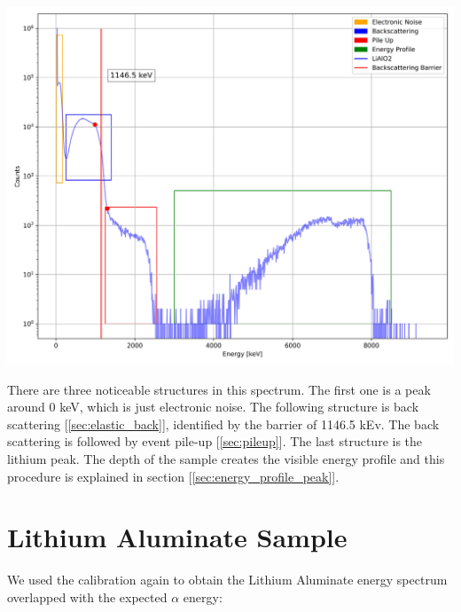 \documentclass{article}
\begin{document}
\begin{multicols}{2}
\begin{center}
    \label{TT_21}
    \centering
    \includegraphics[scale = 0.3]{../../images/FullAnalysisLiF.jpeg}
\end{center}

There are three noticeable structures in this spectrum.
The first one is a peak around 0 keV, which is just electronic noise. The following structure is back scattering [\ref{sec:elastic_back}], identified by the barrier of 1146.5 kEv.
The back scattering is followed by event pile-up [\ref{sec:pileup}].
The last structure is the lithium peak. The depth of the sample creates the visible energy profile and this procedure is explained in section [\ref{sec:energy_profile_peak}].

\section{Lithium Aluminate Sample}
    \label{sec:lialo2}

We used the calibration again to obtain the Lithium Aluminate energy spectrum overlapped with the expected $\alpha$ energy:


\end{multicols}
\end{document}

